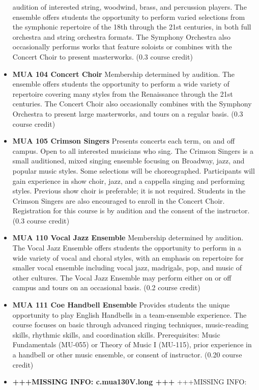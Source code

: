 \documentclass[
  letterpaper,
]{scrbook}
\begin{document}
\begin{itemize}
  audition of interested string, woodwind, brass, and percussion
  players. The ensemble offers students the opportunity to perform
  varied selections from the symphonic repertoire of the 18th through
  the 21st centuries, in both full orchestra and string orchestra
  formats. The Symphony Orchestra also occasionally performs works that
  feature soloists or combines with the Concert Choir to present
  masterworks. (0.3 course credit)
\item
  \textbf{MUA 104 Concert Choir} Membership determined by audition. The
  ensemble offers students the opportunity to perform a wide variety of
  repertoire covering many styles from the Renaissance through the 21st
  centuries. The Concert Choir also occasionally combines with the
  Symphony Orchestra to present large masterworks, and tours on a
  regular basis. (0.3 course credit)
\item
  \textbf{MUA 105 Crimson Singers} Presents concerts each term, on and
  off campus. Open to all interested musicians who sing. The Crimson
  Singers is a small auditioned, mixed singing ensemble focusing on
  Broadway, jazz, and popular music styles. Some selections will be
  choreographed. Participants will gain experience in show choir, jazz,
  and a cappella singing and performing styles. Previous show choir is
  preferable; it is not required. Students in the Crimson Singers are
  also encouraged to enroll in the Concert Choir. Registration for this
  course is by audition and the consent of the instructor. (0.3 course
  credit)
\item
  \textbf{MUA 110 Vocal Jazz Ensemble} Membership determined by
  audition. The Vocal Jazz Ensemble offers students the opportunity to
  perform in a wide variety of vocal and choral styles, with an emphasis
  on repertoire for smaller vocal ensemble including vocal jazz,
  madrigals, pop, and music of other cultures. The Vocal Jazz Ensemble
  may perform either on or off campus and tours on an occasional basis.
  (0.2 course credit)
\item
  \textbf{MUA 111 Coe Handbell Ensemble} Provides students the unique
  opportunity to play English Handbells in a team-ensemble experience.
  The course focuses on basic through advanced ringing techniques,
  music-reading skills, rhythmic skills, and coordination skills.
  Prerequisites: Music Fundamentals (MU-055) or Theory of Music I
  (MU-115), prior experience in a handbell or other music ensemble, or
  consent of instructor. (0.20 course credit)
\item
  \textbf{+++MISSING INFO: c.mua130V.long +++} +++MISSING INFO:

\end{itemize}
\end{document}
